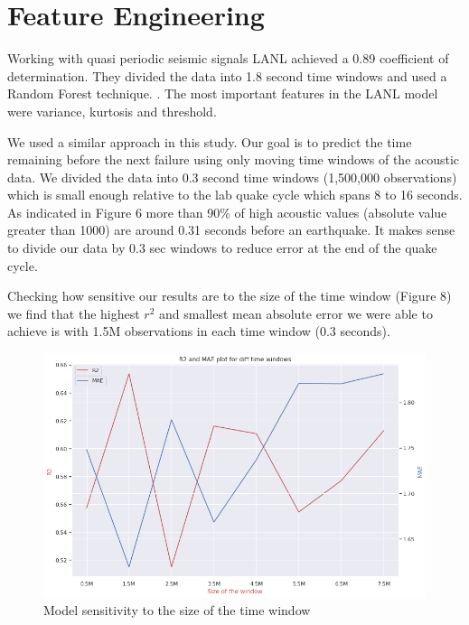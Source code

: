 \documentclass[]{llncs} %
\begin{document}
\section{Feature Engineering}
Working with quasi periodic seismic signals LANL achieved a 0.89 coefficient of determination. They divided the data into 1.8 second time windows and used a Random Forest technique. \cite{Bertrand}. The most important features in the LANL model were variance, kurtosis and threshold. \par
We used a similar approach in this study. Our goal is to predict the time remaining before the next failure using only moving time windows of the acoustic data. We divided the data into 0.3 second time windows (1,500,000 observations) which is small enough relative to the lab quake cycle which spans 8 to 16 seconds. As indicated in Figure 6 more than 90\% of high acoustic values (absolute value greater than 1000) are around 0.31 seconds before an earthquake. It makes sense to divide our data by 0.3 sec windows to reduce error at the end of the quake cycle. \par
Checking how sensitive our results are to the size of the time window (Figure 8) we find that the highest $r^2$ and smallest mean absolute error we were able to achieve is with 1.5M observations in each time window (0.3 seconds). \par
\begin{figure}
	\centering
	\includegraphics[width=.9\linewidth]{rSquaredandMAE}
	\caption{Model sensitivity to the size of the time window}
	\label{fig:rSquaredandMAE}
\end{figure}
\end{document}
